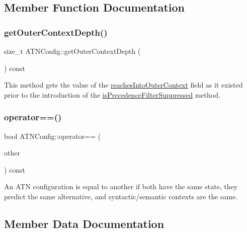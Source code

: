 \subsection{Member Function Documentation}
\mbox{\label{classantlr4_1_1atn_1_1ATNConfig_ad06261312a72cfeb52a351a77c7bbb86}} 
\subsubsection{\texorpdfstring{get\+Outer\+Context\+Depth()}{getOuterContextDepth()}}
{\footnotesize\ttfamily size\+\_\+t A\+T\+N\+Config\+::get\+Outer\+Context\+Depth (\begin{DoxyParamCaption}{ }\end{DoxyParamCaption}) const}

This method gets the value of the \hyperlink{classantlr4_1_1atn_1_1ATNConfig_a3dda5924725f5c1cb7d798dea4b4fca7}{reaches\+Into\+Outer\+Context} field as it existed prior to the introduction of the \hyperlink{}{is\+Precedence\+Filter\+Suppressed} method. \mbox{\label{classantlr4_1_1atn_1_1ATNConfig_a3ec70b1cc06793d2b9d5aab1e662909b}} 
\subsubsection{\texorpdfstring{operator==()}{operator==()}}
{\footnotesize\ttfamily bool A\+T\+N\+Config\+::operator== (\begin{DoxyParamCaption}\item[{const \hyperlink{classantlr4_1_1atn_1_1ATNConfig}{A\+T\+N\+Config} \&}]{other }\end{DoxyParamCaption}) const}

An A\+TN configuration is equal to another if both have the same state, they predict the same alternative, and syntactic/semantic contexts are the same. 

\subsection{Member Data Documentation}
\mbox{\label{classantlr4_1_1atn_1_1ATNConfig_a1f30878a632f67672f16b52eefb01f26}} 
